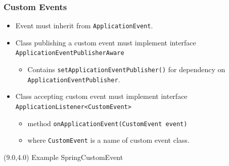 \documentclass[10pt,xcolor=pdflatex, table]{beamer}
\begin{document}
\begin{frame}[fragile]\frametitle{Custom Events}
	\begin{itemize}
		\item Event must inherit from \texttt{ApplicationEvent}.
		\item Class publishing a custom event must implement interface \texttt{ApplicationEventPublisherAware}
          \begin{itemize}
            \item Contains \texttt{setApplicationEventPublisher()} for dependency on \texttt{ApplicationEventPublisher}.
          \end{itemize}
		\item Class accepting custom event must implement interface \texttt{ApplicationListener<CustomEvent>}
          \begin{itemize}
            \item method \texttt{onApplicationEvent(CustomEvent event)}
        	\item where \texttt{CustomEvent} is a name of custom event class.
          \end{itemize}
	\end{itemize}
\begin{textblock}{15}(9.0,4.0)
    {\footnotesize Example SpringCustomEvent}
\end{textblock}
\end{frame}
\end{document}
